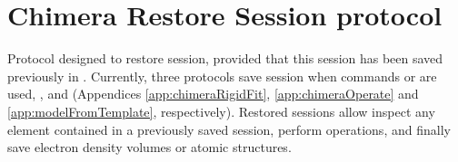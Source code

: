 \section{Chimera Restore Session protocol}
\label{app:chimeraRestoreSession}%

Protocol designed to restore \chimera session, provided that this session has been saved previously in \scipion. Currently, three protocols save \chimera session when \chimera commands  or  are used, ,  and  (Appendices \ref{app:chimeraRigidFit}, \ref{app:chimeraOperate} and \ref{app:modelFromTemplate}, respectively). Restored sessions allow inspect any element contained in a previously saved \chimera session, perform \chimera operations, and finally save electron density volumes or atomic structures.\\

